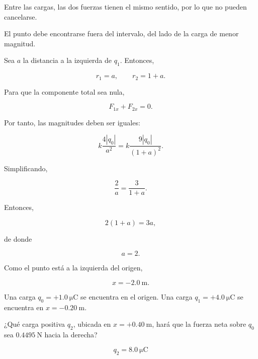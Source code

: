 \begin{explicacion}
Entre las cargas, las dos fuerzas tienen el mismo sentido, por lo que no
pueden cancelarse.

El punto debe encontrarse fuera del intervalo, del lado de la carga de menor
magnitud.

Sea \(a\) la distancia a la izquierda de \(q_1\). Entonces,

\[
r_1=a, \qquad r_2=1+a.
\]

Para que la componente total sea nula,

\[
F_{1x}+F_{2x}=0.
\]

Por tanto, las magnitudes deben ser iguales:

\[
k\frac{4|q_0|}{a^2}
=
k\frac{9|q_0|}{(1+a)^2}.
\]

Simplificando,

\[
\frac{2}{a}=\frac{3}{1+a}.
\]

Entonces,

\[
2(1+a)=3a,
\]

de donde

\[
a=2.
\]

Como el punto está a la izquierda del origen,

\[
\boxed{x=-\SI{2.0}{\metre}}.
\]
\end{explicacion}


\begin{ejercicio}
Una carga \(q_0=+\SI{1.0}{\micro\coulomb}\) se encuentra en el origen.
Una carga \(q_1=+\SI{4.0}{\micro\coulomb}\) se encuentra en
\(x=-\SI{0.20}{\metre}\).

¿Qué carga positiva \(q_2\), ubicada en \(x=+\SI{0.40}{\metre}\), hará que
la fuerza neta sobre \(q_0\) sea \(\SI{0.4495}{\newton}\) hacia la derecha?
\end{ejercicio}

\begin{respuesta}
\[
\boxed{q_2=\SI{8.0}{\micro\coulomb}}
\]
\end{respuesta}

